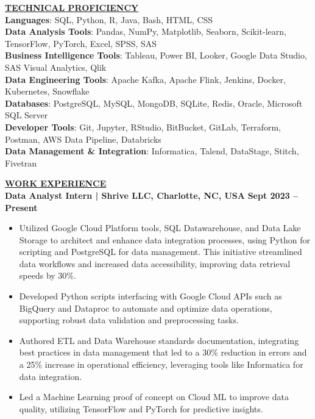 \documentclass{article}
\begin{document}
\noindent \textbf{\underline{TECHNICAL PROFICIENCY}} \\
\textbf{Languages}{: \small SQL, Python, R, Java, Bash, HTML, CSS} \\
\textbf{Data Analysis Tools}{: \small Pandas, NumPy, Matplotlib, Seaborn, Scikit-learn, TensorFlow, PyTorch, Excel, SPSS, SAS} \\
\textbf{Business Intelligence Tools}{: \small Tableau, Power BI, Looker, Google Data Studio, SAS Visual Analytics, Qlik} \\
\textbf{Data Engineering Tools}{: \small Apache Kafka, Apache Flink, Jenkins, Docker, Kubernetes, Snowflake} \\
\textbf{Databases}{: \small PostgreSQL, MySQL, MongoDB, SQLite, Redis, Oracle, Microsoft SQL Server} \\
\textbf{Developer Tools}{: \small Git, Jupyter, RStudio, BitBucket, GitLab, Terraform, Postman, AWS Data Pipeline, Databricks} \\
\textbf{Data Management \& Integration}{: \small Informatica, Talend, DataStage, Stitch, Fivetran} 

\vspace{2mm} 


\noindent \textbf{\underline{WORK EXPERIENCE}}\\
\noindent \textbf{Data Analyst Intern | Shrive LLC, Charlotte, NC, USA} \hfill \textbf{Sept 2023 – Present}
\begin{itemize}[noitemsep,nolistsep,leftmargin=*]
\item {\small Utilized Google Cloud Platform tools, SQL Datawarehouse, and Data Lake Storage to architect and enhance data integration processes, using Python for scripting and PostgreSQL for data management. This initiative streamlined data workflows and increased data accessibility, improving data retrieval speeds by 30\%.}
\item {\small Developed Python scripts interfacing with Google Cloud APIs such as BigQuery and Dataproc to automate and optimize data operations, supporting robust data validation and preprocessing tasks.}
\item {\small Authored ETL and Data Warehouse standards documentation, integrating best practices in data management that led to a 30\% reduction in errors and a 25\% increase in operational efficiency, leveraging tools like Informatica for data integration.}
\item {\small Led a Machine Learning proof of concept on Cloud ML to improve data quality, utilizing TensorFlow and PyTorch for predictive insights.}
\end{itemize}
\end{document}
